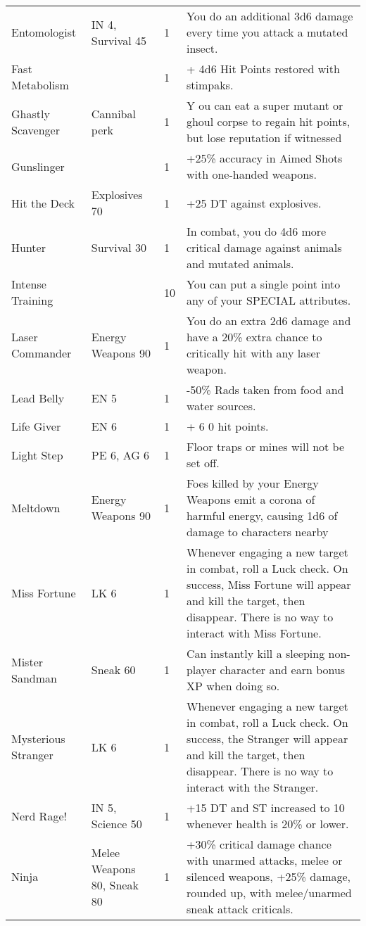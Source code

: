 \begin{longtable}{|p{3.3cm}|p{3.1cm}|p{1.2cm}|p{8.4cm}|}
Entomologist & IN 4, Survival 45 & 1 & You do an additional 3d6 damage every time you attack a mutated insect. \\
Fast Metabolism & & 1 & + 4d6 Hit Points restored with stimpaks. \\
Ghastly Scavenger & Cannibal perk & 1 & Y ou can eat a super mutant or ghoul corpse to regain hit points, but lose reputation if witnessed \\
Gunslinger & & 1 & +25\% accuracy in Aimed Shots with one-handed weapons. \\
Hit the Deck & Explosives 70 & 1 & +25 DT against explosives. \\
Hunter & Survival 30 & 1 & In combat, you do 4d6 more critical damage against animals and mutated animals. \\
Intense Training & & 10 & You can put a single point into any of your SPECIAL attributes. \\
Laser Commander & Energy Weapons 90 & 1 & You do an extra 2d6 damage and have a 20\% extra chance to critically hit with any laser weapon. \\
Lead Belly & EN 5 & 1 & -50\% Rads taken from food and water sources. \\
Life Giver & EN 6 & 1 & + 6 0 hit points. \\
Light Step & PE 6, AG 6 & 1 & Floor traps or mines will not be set off. \\
Meltdown & Energy Weapons 90 & 1 & Foes killed by your Energy Weapons emit a corona of harmful energy, causing 1d6 of damage to characters nearby \\
Miss Fortune & LK 6 & 1 & Whenever engaging a new target in combat, roll a Luck check. On success, Miss Fortune will appear and kill the target, then disappear. There is no way to interact with Miss Fortune. \\
Mister Sandman & Sneak 60 & 1 & Can instantly kill a sleeping non-player character and earn bonus XP when doing so. \\
Mysterious Stranger & LK 6 & 1 & Whenever engaging a new target in combat, roll a Luck check. On success, the Stranger will appear and kill the target, then disappear. There is no way to interact with the Stranger. \\
Nerd Rage! & IN 5, Science 50 & 1 & +15 DT and ST increased to 10 whenever health is 20\% or lower. \\
Ninja & Melee Weapons 80, Sneak 80 & 1 & +30\% critical damage chance with unarmed attacks, melee or silenced weapons, +25\% damage, rounded up, with melee/unarmed sneak attack criticals. \\

\end{longtable}
